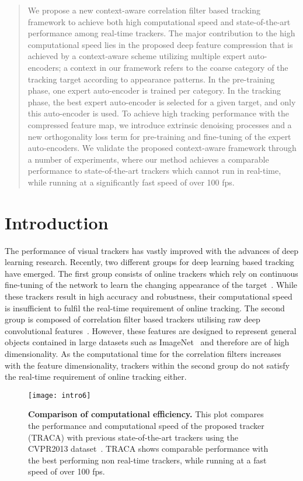 \documentclass[10pt,twocolumn,letterpaper]{article}
\begin{document}
\begin{abstract}
We propose a new context-aware correlation filter based tracking framework to achieve both high computational speed and state-of-the-art performance among real-time trackers.
The major contribution to the high computational speed lies in the proposed deep feature compression that is achieved by a context-aware scheme utilizing multiple expert auto-encoders; a context in our framework refers to the coarse category of the tracking target according to appearance patterns. 
In the pre-training phase, one expert auto-encoder is trained per category.
In the tracking phase, the best expert auto-encoder is selected for a given target, and only this auto-encoder is used.
To achieve high tracking performance with the compressed feature map, we introduce extrinsic denoising processes and a new orthogonality loss term for pre-training and fine-tuning of the expert auto-encoders.
We validate the proposed context-aware framework through a number of experiments, where our method achieves a comparable performance to state-of-the-art trackers which cannot run in real-time, while running at a significantly fast speed of over 100 fps.
\end{abstract} \section{Introduction}
The performance of visual trackers has vastly improved with the advances of deep learning research.
Recently, two different groups for deep learning based tracking have emerged.
The first group consists of online trackers which rely on continuous fine-tuning of the network to learn the changing appearance of the target~\cite{ref:FCNT,ref:MDNet,ref:SINT,ref:STCT,ref:yun}.
While these trackers result in high accuracy and robustness, their computational speed is insufficient to fulfil the real-time requirement of online tracking.
The second group is composed of correlation filter based trackers utilising raw deep convolutional features~\cite{ref:HDT,ref:CF2,ref:DeepSRDCF,ref:COT,ref:ECO}.
However, these features are designed to represent general objects contained in large datasets such as ImageNet~\cite{ref:ImageNet} and therefore are of high dimensionality. 
As the computational time for the correlation filters increases with the feature dimensionality, trackers within the second group do not satisfy the real-time requirement of online tracking either.


\begin{figure}[t]
    \texttt{[image: intro6]}
    \caption{ \textbf{Comparison of computational efficiency.} This plot compares the performance and computational speed of the proposed tracker (TRACA) with previous state-of-the-art trackers using the CVPR2013 dataset~\cite{ref:Benchmark}. TRACA shows comparable performance with the best performing non real-time trackers, while running at a fast speed of over 100 fps.
    }
    \label{fig:introduction}
    \vspace{-0.4cm}
\end{figure}
\end{document}
